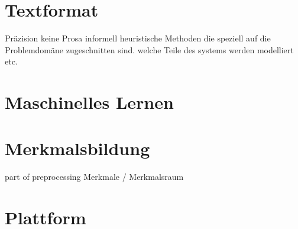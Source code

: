 \section{Textformat}
Präzision
keine Prosa
informell
heuristische Methoden die speziell auf die Problemdomäne zugeschnitten sind.
welche Teile des systems werden modelliert etc.
\section{Maschinelles Lernen}
\section{Merkmalsbildung}
part of preprocessing
Merkmale / Merkmalsraum
\section{Plattform}

